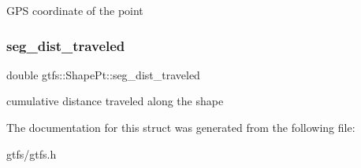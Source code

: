 G\+PS coordinate of the point \mbox{\label{structgtfs_1_1ShapePt_ad3fe477575279af15fe33e0ce36eaad2}} 
\subsubsection{\texorpdfstring{seg\+\_\+dist\+\_\+traveled}{seg\_dist\_traveled}}
{\footnotesize\ttfamily double gtfs\+::\+Shape\+Pt\+::seg\+\_\+dist\+\_\+traveled}

cumulative distance traveled along the shape 

The documentation for this struct was generated from the following file\+:\begin{DoxyCompactItemize}
\item 
gtfs/gtfs.\+h\end{DoxyCompactItemize}
